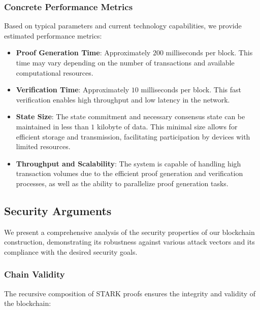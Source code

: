 \documentclass{article}
\theoremstyle{plain}
\theoremstyle{definition}
\theoremstyle{remark}
\theoremstyle{problem}
\begin{document}
\subsubsection{Concrete Performance Metrics}

Based on typical parameters and current technology capabilities, we provide estimated performance metrics:

\begin{itemize}
    \item \textbf{Proof Generation Time}: Approximately $200$ milliseconds per block. This time may vary depending on the number of transactions and available computational resources.

    \item \textbf{Verification Time}: Approximately $10$ milliseconds per block. This fast verification enables high throughput and low latency in the network.

    \item \textbf{State Size}: The state commitment and necessary consensus state can be maintained in less than $1$ kilobyte of data. This minimal size allows for efficient storage and transmission, facilitating participation by devices with limited resources.

    \item \textbf{Throughput and Scalability}: The system is capable of handling high transaction volumes due to the efficient proof generation and verification processes, as well as the ability to parallelize proof generation tasks.
\end{itemize}

\subsection{Security Arguments}

We present a comprehensive analysis of the security properties of our blockchain construction, demonstrating its robustness against various attack vectors and its compliance with the desired security goals.

\subsubsection{Chain Validity}

The recursive composition of STARK proofs ensures the integrity and validity of the blockchain:
\end{document}
